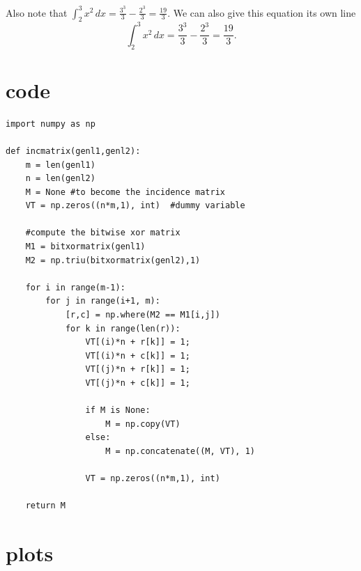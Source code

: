 \documentclass{scrreprt}
\begin{document}
Also note that $\displaystyle \int_2^3 x^2 \, dx=\frac{3^3}{3}-\frac{2^3}{3}=\frac{19}{3}$. 
 We can also give this equation its own line 
\[
	\int_2^3 x^2 \, dx=\frac{3^3}{3}-\frac{2^3}{3}=\frac{19}{3}.
\]

\section{code}
\begin{verbatim}
import numpy as np
    
def incmatrix(genl1,genl2):
    m = len(genl1)
    n = len(genl2)
    M = None #to become the incidence matrix
    VT = np.zeros((n*m,1), int)  #dummy variable
    
    #compute the bitwise xor matrix
    M1 = bitxormatrix(genl1)
    M2 = np.triu(bitxormatrix(genl2),1) 

    for i in range(m-1):
        for j in range(i+1, m):
            [r,c] = np.where(M2 == M1[i,j])
            for k in range(len(r)):
                VT[(i)*n + r[k]] = 1;
                VT[(i)*n + c[k]] = 1;
                VT[(j)*n + r[k]] = 1;
                VT[(j)*n + c[k]] = 1;
                
                if M is None:
                    M = np.copy(VT)
                else:
                    M = np.concatenate((M, VT), 1)
                
                VT = np.zeros((n*m,1), int)
    
    return M
\end{verbatim}

\section{plots}


\glsaddall
\printglossaries
\printbibliography[heading=bibintoc]
\end{document}

